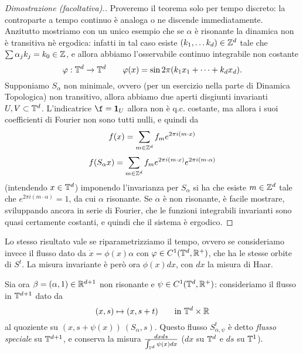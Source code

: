 \begin{proof}[Dimostrazione (facoltativa).]
 Proveremo il teorema solo per tempo discreto: la controparte a tempo continuo è analoga o ne discende immediatamente. 
 Anzitutto mostriamo con un unico esempio che se $\alpha$ è risonante la dinamica non è transitiva nè ergodica: 
 infatti in tal caso esiste $(k_1,\dots k_d)\in\mathbb{Z}^d$ tale che $\sum\alpha_j k_j=k_0\in\mathbb{Z}$, e allora abbiamo l'osservabile continuo integrabile non costante
 \[\varphi:\mathbb{T}^d\rightarrow \mathbb{T}^d \qquad \varphi(x)=\sin 2\pi(k_1x_1+\dots+k_dx_d).\]
 Supponiamo $S_\alpha$ non minimale, ovvero (per un esercizio nella parte di Dinamica Topologica) non transitivo, 
 allora abbiamo due aperti disgiunti invarianti $U,V\subset \mathbb{T}^d$. L'indicatrice $\f=\uno_U$ allora non è q.c. costante, ma allora i suoi coefficienti di Fourier
 non sono tutti nulli, e quindi da
 \[f(x)=\sum_{m\in \mathbb{Z}^d} f_m e^{2\pi i (m\cdot x)}\]
 \[f(S_\alpha x )=\sum_{m\in \mathbb{Z}^d} f_m e^{2\pi i (m\cdot x)} e^{2\pi i (m\cdot \alpha)}\]
 (intendendo $x\in \mathbb{T}^d$) imponendo l'invarianza per $S_\alpha$ si ha che esiste $m\in\mathbb{Z}^d$ tale che $e^{2\pi i (m\cdot \alpha)}=1$, da cui $\alpha$ risonante.
 Se $\alpha$ è non risonante, è facile mostrare, sviluppando ancora in serie di Fourier, che le funzioni integrabili invarianti sono quasi certamente costanti,
 e quindi che il sistema è ergodico.
\end{proof}

























Lo stesso risultato vale se riparametrizziamo il tempo, ovvero se consideriamo invece il flusso dato da $\dot x=\phi(x)\alpha$ con $\varphi\in C^1(\mathbb{T}^d,\mathbb{R}^+)$, che ha le stesse orbite di $S^t$. La misura invariante è però ora $\phi(x)dx$, con $dx$ la misura di Haar.

Sia ora $\beta=(\alpha,1)\in \mathbb{R}^{d+1}$ non risonante e $\psi\in C^1(\mathbb{T}^d,\mathbb{R}^+)$: consideriamo il flusso in $\mathbb{T}^{d+1}$ dato da 
\[(x,s)\mapsto(x,s+t) \qquad \mbox{in }\mathbb{T}^d\times \mathbb{R}\]
al quoziente su $(x,s+\psi(x))~(S_\alpha,s)$. Questo flusso $S^t_{\alpha,\psi}$ è detto \emph{flusso speciale} su $\mathbb{T}^{d+1}$, e conserva la misura $\frac{dxds}{\int_{\mathbb{T}^d}\psi(x)dx}$ ($dx$ su $\mathbb{T}^d$ e $ds$ su $\mathbb{T}^1$).


